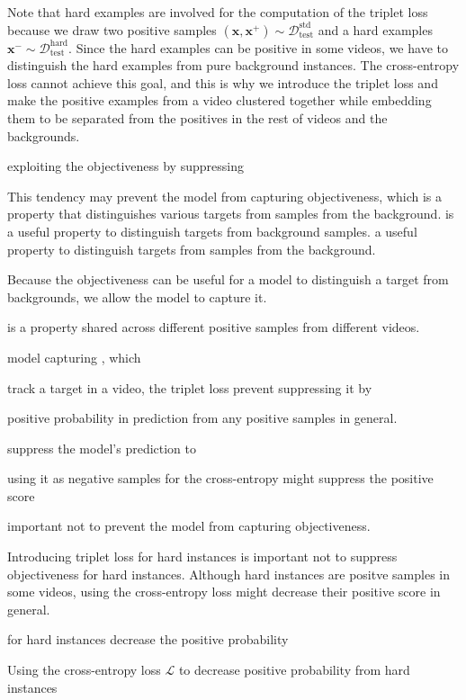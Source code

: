 \documentclass[letterpaper]{article} %
\def \x{\mathbf{x}}
\def \dataval{\mathcal{D}_\text{test}}
\begin{document}
Note that hard examples are involved for the computation of the triplet loss because we draw two positive samples $(\x, \x^+)\sim\dataval^\text{std}$ and a hard examples $\x^- \sim \dataval^\text{hard}$.
Since the hard examples can be positive in some videos, we have to distinguish the hard examples from pure background instances.
The cross-entropy loss cannot achieve this goal, and this is why we introduce the triplet loss and make the positive examples from a video clustered together while embedding them to be separated from the positives in the rest of videos  and the backgrounds.



\iffalse

exploiting the objectiveness by suppressing

This tendency may prevent the model from capturing objectiveness, which is a property that distinguishes various targets from samples from the background. is a useful property to distinguish targets from background samples.
a useful property to distinguish targets from samples from the background.



Because the objectiveness can be useful for a model to distinguish a target from backgrounds, we allow the model to capture it.


is a property shared across different positive samples from different videos.

model capturing , which

track a target in a video, the triplet loss prevent suppressing it by

positive probability in prediction from any positive samples in general.



suppress the model's prediction to

using it as negative samples for the cross-entropy might suppress the positive score

important not to prevent the model from capturing objectiveness.


Introducing triplet loss for hard instances is important not to suppress objectiveness for hard instances.
Although hard instances are positve samples in some videos, using the cross-entropy loss might decrease their positive score in general.


for hard instances decrease the positive probability

Using the cross-entropy loss $\mathcal{L}$ to decrease positive probability from hard instances
\end{document}
